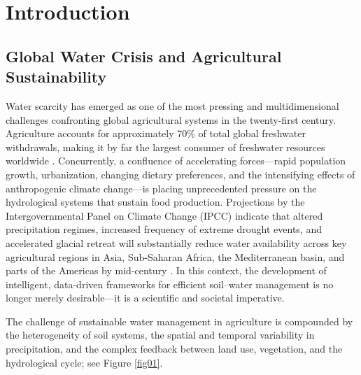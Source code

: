 \documentclass[land,review,accept,pdftex,oneauthor]{Definitions/mdpi}
\begin{document}

\section{Introduction}\label{sec1}

\subsection{Global Water Crisis and Agricultural Sustainability}

Water scarcity has emerged as one of the most pressing and multidimensional challenges confronting global agricultural systems in the twenty-first century. Agriculture accounts for approximately 70\% of total global freshwater withdrawals, making it by far the largest consumer of freshwater resources worldwide \citep{fao2020state}. Concurrently, a confluence of accelerating forces---rapid population growth, urbanization, changing dietary preferences, and the intensifying effects of anthropogenic climate change---is placing unprecedented pressure on the hydrological systems that sustain food production. Projections by the Intergovernmental Panel on Climate Change (IPCC) indicate that altered precipitation regimes, increased frequency of extreme drought events, and accelerated glacial retreat will substantially reduce water availability across key agricultural regions in Asia, Sub-Saharan Africa, the Mediterranean basin, and parts of the Americas by mid-century \citep{ipcc2022ar6}. In this context, the development of intelligent, data-driven frameworks for efficient soil--water management is no longer merely desirable---it is a scientific and societal imperative.

The challenge of sustainable water management in agriculture is compounded by the heterogeneity of soil systems, the spatial and temporal variability in precipitation, and the complex feedback between land use, vegetation, and the hydrological cycle; see Figure \ref{fig01}.
\end{document}
